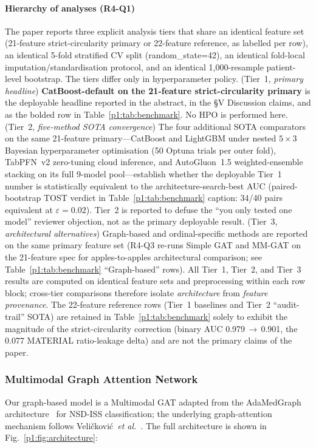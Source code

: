 \documentclass[10pt,letterpaper]{article}
\begin{document}
\paragraph*{Hierarchy of analyses (R4-Q1)} The paper reports three explicit analysis tiers that share an identical feature set (21-feature strict-circularity primary or 22-feature reference, as labelled per row), an identical 5-fold stratified CV split (random\_state=42), an identical fold-local imputation/standardisation protocol, and an identical 1{,}000-resample patient-level bootstrap. The tiers differ only in hyperparameter policy. (Tier~1, \emph{primary headline}) \textbf{CatBoost-default on the 21-feature strict-circularity primary} is the deployable headline reported in the abstract, in the §V Discussion claims, and as the bolded row in Table~\ref{p1:tab:benchmark}. No HPO is performed here. (Tier~2, \emph{five-method SOTA convergence}) The four additional SOTA comparators on the same 21-feature primary---CatBoost and LightGBM under nested $5{\times}3$ Bayesian hyperparameter optimisation (50 Optuna trials per outer fold), TabPFN~v2 zero-tuning cloud inference, and AutoGluon~1.5 weighted-ensemble stacking on its full 9-model pool---establish whether the deployable Tier~1 number is statistically equivalent to the architecture-search-best AUC (paired-bootstrap TOST verdict in Table~\ref{p1:tab:benchmark} caption: 34/40 pairs equivalent at $\varepsilon{=}0.02$). Tier~2 is reported to defuse the ``you only tested one model'' reviewer objection, not as the primary deployable result. (Tier~3, \emph{architectural alternatives}) Graph-based and ordinal-specific methods are reported on the same primary feature set (R4-Q3 re-runs Simple GAT and MM-GAT on the 21-feature spec for apples-to-apples architectural comparison; see Table~\ref{p1:tab:benchmark} ``Graph-based'' rows). All Tier~1, Tier~2, and Tier~3 results are computed on identical feature sets and preprocessing within each row block; cross-tier comparisons therefore isolate \emph{architecture} from \emph{feature provenance}. The 22-feature reference rows (Tier~1 baselines and Tier~2 ``audit-trail'' SOTA) are retained in Table~\ref{p1:tab:benchmark} solely to exhibit the magnitude of the strict-circularity correction (binary AUC 0.979$\,\to\,$0.901, the $0.077$ MATERIAL ratio-leakage delta) and are not the primary claims of the paper.

\subsubsection*{Multimodal Graph Attention Network}
Our graph-based model is a Multimodal GAT adapted from the AdaMedGraph architecture~\cite{adamedgraph} for NSD-ISS classification; the underlying graph-attention mechanism follows Veli\v{c}kovi\'{c}~\textit{et al.}~\cite{velickovic2018gat}. The full architecture is shown in Fig.~\ref{p1:fig:architecture}:
\end{document}
